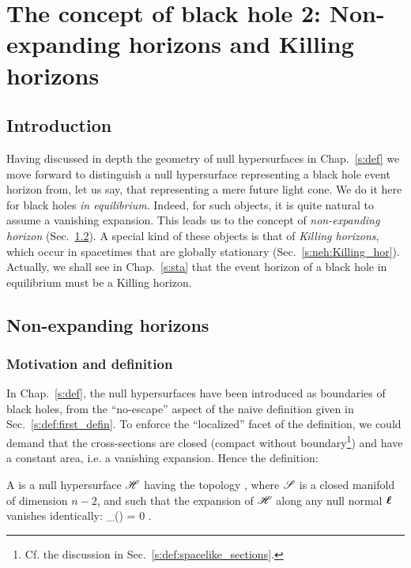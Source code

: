 \chapter{The concept of black hole 2: Non-expanding horizons and Killing horizons}
\label{s:neh}

\minitoc

\section{Introduction}

Having discussed in depth the geometry of null hypersurfaces in Chap.~\ref{s:def}
we move forward to distinguish a null hypersurface representing a black hole event horizon from, let us say, that representing a mere future light cone. We do it here for black holes
\emph{in equilibrium}. Indeed, for such objects, it is quite natural
to assume a vanishing expansion. This leads us to the concept of \emph{non-expanding
horizon} (Sec.~\ref{s:neh:neh}). A special kind of these objects is that
of \emph{Killing horizons}, which occur in spacetimes that are globally
stationary (Sec.~\ref{s:neh:Killing_hor}). Actually, we shall
see in Chap.~\ref{s:sta} that the event horizon of a black hole in equilibrium
must be a Killing horizon.



\section{Non-expanding horizons} \label{s:neh:neh}

\subsection{Motivation and definition} \label{s:neh:def}

In Chap.~\ref{s:def}, the null hypersurfaces have been introduced as boundaries
of black holes, from the ``no-escape'' aspect of the naive definition given in
Sec.~\ref{s:def:first_defin}. To enforce the ``localized'' facet of the definition,
we could demand that the cross-sections are closed (compact without boundary\footnote{Cf. the discussion in Sec.~\ref{s:def:spacelike_sections}.})
and have a constant area, i.e. a vanishing expansion. Hence the definition:
\begin{greybox}
A  is a null hypersurface $\mathscr{H}$ having the
topology
\be \label{e:neh:H_topology}
    \Hor \simeq \R \times \Sp,
\ee
where $\mathscr{S}$ is a closed manifold of dimension $n-2$,
and such that the expansion of $\mathscr{H}$ along any null normal $\bm{\ell}$ vanishes
identically:
\be
    \theta_{(\wl)} = 0 .
\ee
\end{greybox}

